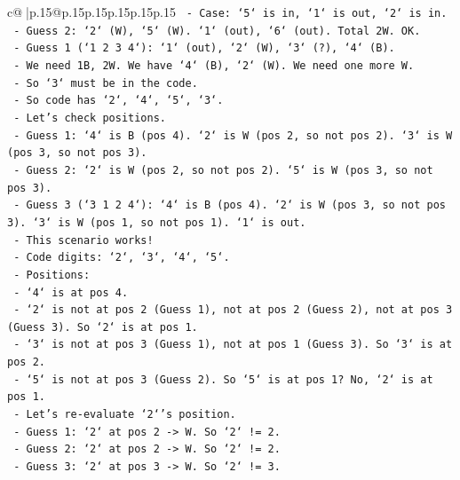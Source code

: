 \documentclass{article}
\begin{document}
{\begin{supertabular}{c@{$\;$}|p{.15\linewidth}@{}p{.15\linewidth}p{.15\linewidth}p{.15\linewidth}p{.15\linewidth}p{.15\linewidth}}
{{{\texttt{                {-} Case: `5` is in, `1` is out, `2` is in.} \\
\texttt{                    {-} Guess 2: `2` (W), `5` (W). `1` (out), `6` (out). Total 2W. OK.} \\
\texttt{                    {-} Guess 1 (`1 2 3 4`): `1` (out), `2` (W), `3` (?), `4` (B).} \\
\texttt{                    {-} We need 1B, 2W. We have `4` (B), `2` (W). We need one more W.} \\
\texttt{                    {-} So `3` must be in the code.} \\
\texttt{                    {-} So code has `2`, `4`, `5`, `3`.} \\
\texttt{                    {-} Let's check positions.} \\
\texttt{                    {-} Guess 1: `4` is B (pos 4). `2` is W (pos 2, so not pos 2). `3` is W (pos 3, so not pos 3).} \\
\texttt{                    {-} Guess 2: `2` is W (pos 2, so not pos 2). `5` is W (pos 3, so not pos 3).} \\
\texttt{                    {-} Guess 3 (`3 1 2 4`): `4` is B (pos 4). `2` is W (pos 3, so not pos 3). `3` is W (pos 1, so not pos 1). `1` is out.} \\
\texttt{                    {-} This scenario works!} \\
\texttt{                    {-} Code digits: `2`, `3`, `4`, `5`.} \\
\texttt{                    {-} Positions:} \\
\texttt{                        {-} `4` is at pos 4.} \\
\texttt{                        {-} `2` is not at pos 2 (Guess 1), not at pos 2 (Guess 2), not at pos 3 (Guess 3). So `2` is at pos 1.} \\
\texttt{                        {-} `3` is not at pos 3 (Guess 1), not at pos 1 (Guess 3). So `3` is at pos 2.} \\
\texttt{                        {-} `5` is not at pos 3 (Guess 2). So `5` is at pos 1? No, `2` is at pos 1.} \\
\texttt{                        {-} Let's re{-}evaluate `2`'s position.} \\
\texttt{                        {-} Guess 1: `2` at pos 2 {-}> W. So `2` != 2.} \\
\texttt{                        {-} Guess 2: `2` at pos 2 {-}> W. So `2` != 2.} \\
\texttt{                        {-} Guess 3: `2` at pos 3 {-}> W. So `2` != 3.} \\
}}}
\end{supertabular}}
\end{document}
